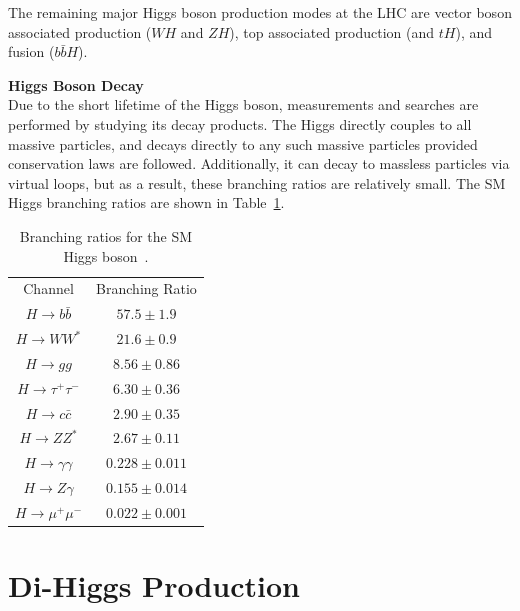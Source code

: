 The remaining major Higgs boson production modes at the \gls{LHC} are vector boson associated production ($WH$ and $ZH$), top associated production (\tth and $tH$), and \bb fusion ($b\bar{b}H$).


\noindent \textbf{Higgs Boson Decay}\\
\indent Due to the short lifetime of the Higgs boson, measurements and searches are performed by studying its decay products. The Higgs directly couples to all massive particles, and decays directly to any such massive particles provided conservation laws are followed. Additionally, it can decay to massless particles via virtual loops, but as a result, these branching ratios are relatively small. The \gls{SM} Higgs branching ratios are shown in Table~\ref{tab:higgs-decays}. 

\begin{table}[!thp]
    \centering
    \caption[Branching ratios for the \gls{SM} Higgs boson]{Branching ratios for the \gls{SM} Higgs boson~\cite{pdg}.}
    \begin{tabular}{c|c}
        Channel & Branching Ratio \\
        \cline{1-2}
        $H \rightarrow b\bar{b}$ & $57.5 \pm 1.9$\\
        $H \rightarrow WW^*$ & $21.6 \pm 0.9$\\
        $H \rightarrow gg$ & $8.56 \pm 0.86$\\
        $H \rightarrow \tau^+ \tau^-$ & $6.30 \pm 0.36$\\
        $H \rightarrow c\bar{c}$ & $2.90 \pm 0.35$\\
        $H \rightarrow ZZ^*$ & $2.67 \pm 0.11$\\
        $H \rightarrow \gamma\gamma$ & $0.228 \pm 0.011$\\
        $H \rightarrow Z\gamma$ & $0.155 \pm 0.014$\\
        $H \rightarrow \mu^+ \mu^-$ & $0.022 \pm 0.001$
    \end{tabular}
    \label{tab:higgs-decays}
\end{table}



\section{Di-Higgs Production}\label{sec:diHiggs}


